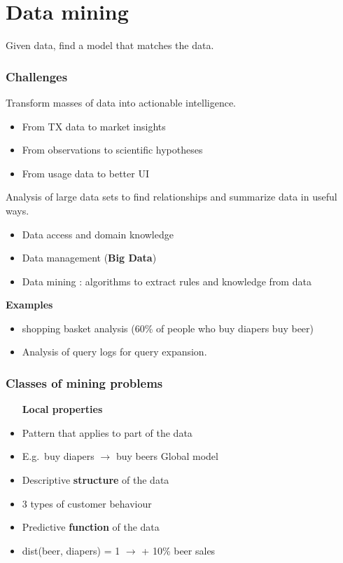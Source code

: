 \section{Data mining}
Given data, find a model that matches the data.

\subsubsection{Challenges}
Transform masses of data into actionable intelligence.
\begin{itemize}
\item From TX data to market insights
\item From observations to scientific hypotheses
\item From usage data to better UI
\end{itemize}

Analysis of large data sets to find relationships and summarize data
in useful ways.

\begin{itemize}
\item Data access and domain knowledge
\item Data management (\textbf{Big Data})
\item Data mining : algorithms to extract rules and knowledge from data
\end{itemize}

\textbf{Examples}
\begin{itemize}
\item shopping basket analysis (60\% of people who buy diapers buy
  beer)
\item Analysis of query logs for query expansion.
\end{itemize}

\subsubsection{Classes of mining problems}
\begin{itemize}
 \item [\textbf{Local properties}]
\item Pattern that applies to part of the data
  \quad \item E.g.\ buy diapers $ \rightarrow $ buy beers
  Global model
\item Descriptive \textbf{structure} of the data
  \quad \item 3 types of customer behaviour
\item Predictive \textbf{function} of the data
  \quad \item dist(beer, diapers) = 1 $ \rightarrow $ + 10\% beer sales
\end{itemize}

